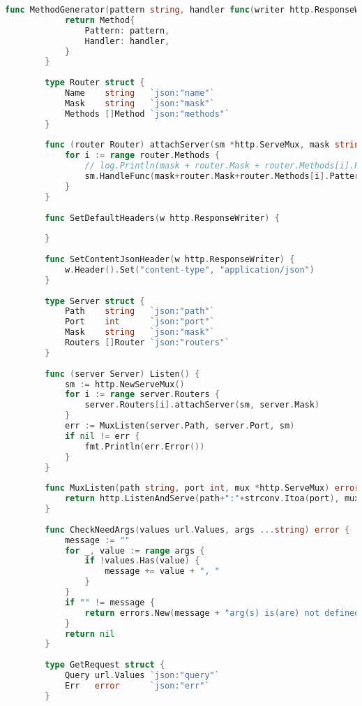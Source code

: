 \documentclass[UTF8]{ctexart}
\begin{document}
\begin{lstlisting}[language=go]
        func MethodGenerator(pattern string, handler func(writer http.ResponseWriter, request *http.Request)) Method {
            return Method{
                Pattern: pattern,
                Handler: handler,
            }
        }
        
        type Router struct {
            Name    string   `json:"name"`
            Mask    string   `json:"mask"`
            Methods []Method `json:"methods"`
        }
        
        func (router Router) attachServer(sm *http.ServeMux, mask string) {
            for i := range router.Methods {
                // log.Println(mask + router.Mask + router.Methods[i].Pattern) // TODO Remove router output.
                sm.HandleFunc(mask+router.Mask+router.Methods[i].Pattern, router.Methods[i].Handler)
            }
        }
        
        func SetDefaultHeaders(w http.ResponseWriter) {
        
        }
        
        func SetContentJsonHeader(w http.ResponseWriter) {
            w.Header().Set("content-type", "application/json")
        }
        
        type Server struct {
            Path    string   `json:"path"`
            Port    int      `json:"port"`
            Mask    string   `json:"mask"`
            Routers []Router `json:"routers"`
        }
        
        func (server Server) Listen() {
            sm := http.NewServeMux()
            for i := range server.Routers {
                server.Routers[i].attachServer(sm, server.Mask)
            }
            err := MuxListen(server.Path, server.Port, sm)
            if nil != err {
                fmt.Println(err.Error())
            }
        }
        
        func MuxListen(path string, port int, mux *http.ServeMux) error {
            return http.ListenAndServe(path+":"+strconv.Itoa(port), mux)
        }
        
        func CheckNeedArgs(values url.Values, args ...string) error {
            message := ""
            for _, value := range args {
                if !values.Has(value) {
                    message += value + ", "
                }
            }
            if "" != message {
                return errors.New(message + "arg(s) is(are) not defined.")
            }
            return nil
        }
        
        type GetRequest struct {
            Query url.Values `json:"query"`
            Err   error      `json:"err"`
        }
        

\end{lstlisting}
\end{document}
